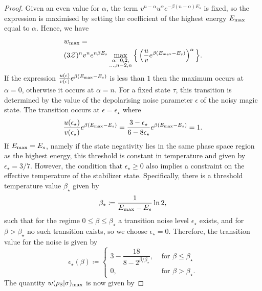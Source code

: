 \documentclass[pra,
aps,
twocolumn,
superscriptaddress,
groupedaddress,
nofootinbib,
reprint
]{revtex4-1}
\begin{document}
\begin{proof}
Given an even value for $\alpha$, the term $v^{n-\alpha} u^{\alpha} e^{-\beta (n-\alpha)E_s}$ is fixed, so the expression is maximised by setting the coefficient of the highest energy $E_{\rm{max}}$ equal to $\alpha$.
Hence, we have
\begin{align}
	&w_{\rm max} = \nonumber\\
	&(3\mathcal{Z})^{n} v^n e^{n\beta E_s}\max\limits_{\substack{\alpha = 0,2, \\ \dots,n-2,n}}{\Big\{ \left( \frac{u}{v} e^{\beta (E_{\rm{max}} - E_s)} \right)^{\alpha} \Big\}}.
\end{align}
If the expression $\frac{u(\epsilon)}{v(\epsilon)} e^{\beta (E_{\rm{max}} - E_s)}$ is less than $1$ then the maximum occurs at $\alpha=0$, otherwise it occurs at $\alpha = n$. For a fixed state $\tau$, this transition is determined by the value of the depolarising noise parameter $\epsilon$ of the noisy magic state. The transition occurs at $\epsilon = \epsilon_\star$ where
\begin{equation}\label{eq:noise_transition}
	\frac{u(\epsilon_\star)}{v(\epsilon_\star)} e^{\beta (E_{\rm{max}} - E_s)} = \frac{3-\epsilon_\star}{6-8\epsilon_\star} e^{\beta (E_{\rm{max}} - E_s)} = 1.
\end{equation}
If $E_{\rm{max}} = E_s$, namely if the state negativity lies in the same phase space region as the highest energy, this threshold is constant in temperature and given by $\epsilon_{\star} = 3/7$. However, the condition that $\epsilon_\star \ge 0$ also implies a constraint on the effective temperature of the stabilizer state. Specifically, there is a threshold temperature value $\beta_\star$ given by
\begin{equation}
	\beta_{\star} \coloneqq \frac{1}{E_{\rm{max}} - E_s} \ln2,
\end{equation}
such that for the regime $0 \leq \beta \leq \beta_\star$ a transition noise level $\epsilon_\star$ exists, and for $\beta > \beta_\star$ no such transition exists, so we choose $\epsilon_\star = 0$. 
Therefore, the transition value for the noise is given by
\begin{equation}
	\epsilon_{\star}(\beta) \coloneqq 
	\begin{cases}
		3 - \dfrac{18}{8-2^{\beta/\beta_\star}}, &\text{ for } \beta \leq \beta_\star \\
		0, &\text{ for } \beta > \beta_\star.
	\end{cases}
\end{equation}
The quantity $w(\rho_{\rm{S}} | \sigma)_{\rm{max}}$ is now given by

\end{proof}
\end{document}
